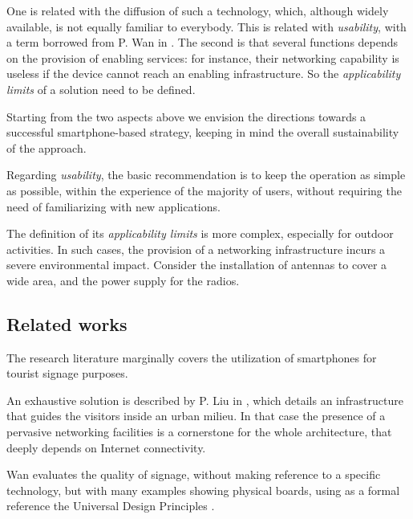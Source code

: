 \documentclass[sustainability,article,submit,pdftex,moreauthors]{Definitions/mdpi}
\begin{document}
One is related with the diffusion of such a technology, which, although widely available, is not equally familiar to everybody. This is related with {\em usability}, with a term borrowed from P. Wan in \cite{wan22a}. The second is that several functions depends on the provision of enabling services: for instance, their networking capability is useless if the device cannot reach an enabling infrastructure. So the {\em applicability limits} of a solution need to be defined.


Starting from the two aspects above we envision the directions towards a successful smartphone-based strategy, keeping in mind the overall sustainability of the approach.

Regarding {\em usability}, the basic recommendation is to keep the operation as simple as possible, within the experience of the majority of users, without requiring the need of familiarizing with new applications.

The definition of its {\em applicability limits} is more complex, especially for outdoor activities. In such cases, the provision of a networking infrastructure incurs a severe environmental impact. Consider the installation of antennas to cover a wide area, and the power supply for the radios. 


\subsection{Related works}

The research literature marginally covers the utilization of smartphones for tourist signage purposes.

An exhaustive solution is described by P. Liu in \cite{liu16a}, which details an infrastructure that guides the visitors inside an urban milieu. In that case the presence of a pervasive networking facilities is a cornerstone for the whole architecture, that deeply depends on Internet connectivity. 

Wan \cite{wan22a} evaluates the quality of signage, without making reference to a specific technology, but with many examples showing physical boards, using as a formal reference the Universal Design Principles \cite{udi97a}.
\end{document}
